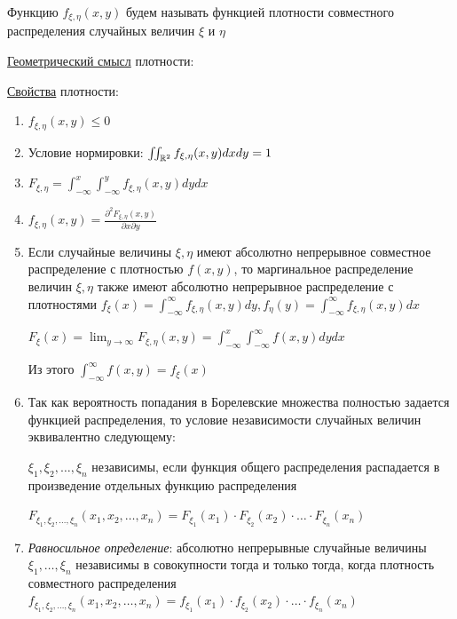 \documentclass[12pt]{article}
\begin{document}
    Функцию $f_{\xi, \eta}(x, y)$ будем называть функцией плотности совместного распределения случайных величин $\xi$ и $\eta$

    \underline{Геометрический смысл} плотности: 


    \underline{Свойства} плотности:

    \begin{enumerate}
        \item $f_{\xi, \eta}(x, y) \leq 0$
        \item Условие нормировки: $\iint_{\mathbb{R}^2} f_{\xi, \eta}(x, y) dxdy = 1$
        \item $F_{\xi, \eta} = \int_{-\infty}^x \int_{-\infty}^y f_{\xi, \eta}(x, y) dydx$

        \item $f_{\xi, \eta}(x, y) = \frac{\partial^2 F_{\xi, \eta}(x, y)}{\partial x \partial y}$
        
        \item Если случайные величины $\xi, \eta$ имеют абсолютно непрерывное совместное распределение с плотностью $f(x, y)$, 
        то маргинальное распределение величин $\xi, \eta$ также имеют абсолютно непрерывное распределение
        с плотностями $f_\xi(x) = \int_{-\infty}^\infty f_{\xi, \eta}(x, y) dy, f_\eta(y) = \int_{-\infty}^\infty f_{\xi, \eta}(x, y) dx$

        \begin{MyProof}
            $F_{\xi}(x) = \lim_{y \to \infty} F_{\xi, \eta}(x, y) = \int_{-\infty}^x \int_{-\infty}^\infty f(x, y) dydx$

            Из этого $\int_{-\infty}^\infty f(x, y) = f_\xi(x)$
        \end{MyProof}

        \item Так как вероятность попадания в Борелевские множества полностью задается функцией распределения, 
        то условие независимости случайных величин эквивалентно следующему:

        $\xi_1, \xi_2, \dots, \xi_n$ независимы, если функция общего распределения распадается в произведение 
        отдельных функцию распределения
    
        $F_{\xi_1, \xi_2, \dots, \xi_n}(x_1, x_2, \dots, x_n) = F_{\xi_1}(x_1) \cdot F_{\xi_2}(x_2) \cdot \dots \cdot F_{\xi_n}(x_n)$

        \item \textit{Равносильное определение}: абсолютно непрерывные случайные величины $\xi_1, \dots, \xi_n$ независимы в совокупности тогда и только тогда, 
        когда плотность совместного распределения $f_{\xi_1, \xi_2, \dots, \xi_n}(x_1, x_2, \dots, x_n) = f_{\xi_1}(x_1) \cdot f_{\xi_2}(x_2) \cdot \dots \cdot f_{\xi_n}(x_n)$
    

\end{enumerate}
\end{document}
